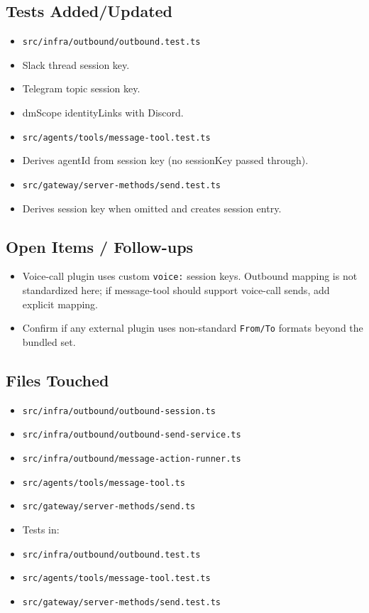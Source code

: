 \subsection{Tests Added/Updated}


\begin{itemize}
  \item \texttt{src/infra/outbound/outbound.test.ts}
  \item Slack thread session key.
  \item Telegram topic session key.
  \item dmScope identityLinks with Discord.
  \item \texttt{src/agents/tools/message-tool.test.ts}
  \item Derives agentId from session key (no sessionKey passed through).
  \item \texttt{src/gateway/server-methods/send.test.ts}
  \item Derives session key when omitted and creates session entry.
\end{itemize}


\subsection{Open Items / Follow-ups}


\begin{itemize}
  \item Voice-call plugin uses custom \texttt{voice:} session keys. Outbound mapping is not standardized here; if message-tool should support voice-call sends, add explicit mapping.
  \item Confirm if any external plugin uses non-standard \texttt{From/To} formats beyond the bundled set.
\end{itemize}


\subsection{Files Touched}


\begin{itemize}
  \item \texttt{src/infra/outbound/outbound-session.ts}
  \item \texttt{src/infra/outbound/outbound-send-service.ts}
  \item \texttt{src/infra/outbound/message-action-runner.ts}
  \item \texttt{src/agents/tools/message-tool.ts}
  \item \texttt{src/gateway/server-methods/send.ts}
  \item Tests in:
  \item \texttt{src/infra/outbound/outbound.test.ts}
  \item \texttt{src/agents/tools/message-tool.test.ts}
  \item \texttt{src/gateway/server-methods/send.test.ts}
\end{itemize}



